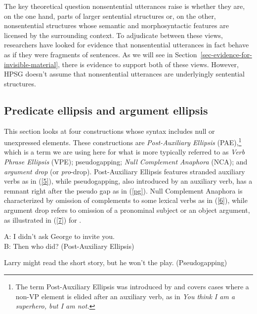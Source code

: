The key theoretical question nonsentential utterances raise is whether they are, on the one hand, parts of larger sentential structures or, on the other, nonsentential structures whose semantic and morphosyntactic features are licensed by the surrounding context. To adjudicate between these views, researchers have looked for evidence that nonsentential utterances in fact behave as if they were fragments of sentences. As we will see in Section~\ref{sec-evidence-for-invisible-material}, there is evidence to support both of these views. However, HPSG doesn't assume that nonsentential utterances are underlyingly sentential structures.

\subsection{Predicate ellipsis and argument ellipsis}
\label{ellipsis-sec-Predicate-ellipsis-and-argument-ellipsis}

This section looks at four constructions whose syntax includes null or unexpressed elements. These
constructions are \emph{Post-Auxiliary Ellipsis} (PAE),\footnote{The term Post-Auxiliary Ellipsis was introduced by
  \citet[53]{Sag1976} and covers cases where a non-VP element is elided after an auxiliary verb, as in \emph{You think
  I am a superhero, but I am not.}%
} 
which is a term we are using here for what is more typically referred to as \emph{Verb Phrase Ellipsis}
(VPE); pseudogapping; \emph{Null Complement Anaphora} (NCA); and \emph{argument drop} (or
\emph{pro}-drop). Post-Auxiliary Ellipsis features stranded auxiliary verbs as in (\ref{5}), while pseudogapping, also
introduced by an auxiliary verb, has a remnant right after the pseudo gap as in (\ref{pg}). 
%
%
%
%
Null Complement Anaphora is characterized by omission of complements to some lexical verbs as in (\ref{6}), while argument drop refers to omission of a pronominal subject or an object argument, as illustrated in (\ref{7}) for .

\ea A: I didn't ask George to invite you.\\B: Then who did? (Post-Auxiliary Ellipsis) \label{5}\z

\ea 
Larry might read the short story, but he won't the play.
(Pseudogapping) \label{pg}\z

